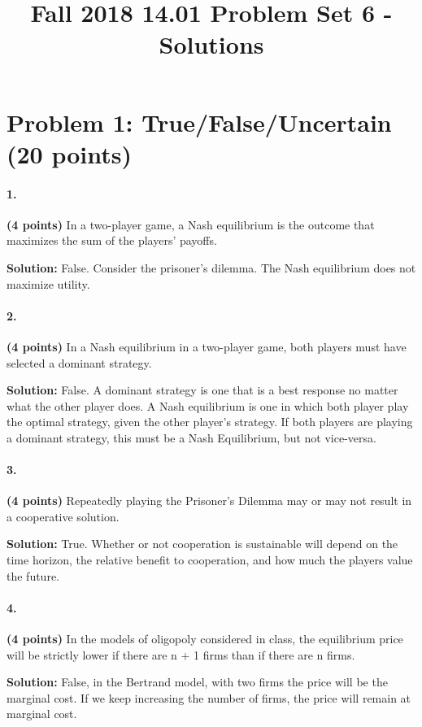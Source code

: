 \documentclass[11pt]{article}
\title{Fall 2018 14.01 Problem Set 6 - Solutions}
\date{}
\begin{document}
\maketitle

\section*{Problem 1: True/False/Uncertain (20 points)}

\paragraph{1.} \textbf{(4 points)} In a two-player game, a Nash equilibrium is the outcome that maximizes the sum of the players’ payoffs.

\textbf{Solution:} False. Consider the prisoner’s dilemma. The Nash equilibrium does not maximize utility.

\paragraph{2.} \textbf{(4 points)} In a Nash equilibrium in a two-player game, both players must have selected a dominant strategy.

\textbf{Solution:} False. A dominant strategy is one that is a best response no matter what the other player does. A Nash equilibrium is one in which both player play the optimal strategy, given the other player’s strategy. If both players are playing a dominant strategy, this must be a Nash Equilibrium, but not vice-versa.

\paragraph{3.} \textbf{(4 points)} Repeatedly playing the Prisoner’s Dilemma may or may not result in a cooperative solution.

\textbf{Solution:} True. Whether or not cooperation is sustainable will depend on the time horizon, the relative benefit to cooperation, and how much the players value the future.

\paragraph{4.} \textbf{(4 points)} In the models of oligopoly considered in class, the equilibrium price will be strictly lower if there are n + 1 firms than if there are n firms.

\textbf{Solution:} False, in the Bertrand model, with two firms the price will be the marginal cost. If we keep increasing the number of firms, the price will remain at marginal cost.
\end{document}
